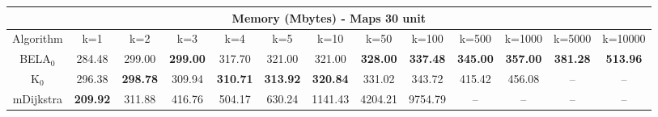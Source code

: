 \begin{tabular}{c|cccccccccccc}\toprule
\multicolumn{13}{c}{Memory (Mbytes) - Maps 30 unit}\\ \midrule
Algorithm & k=1 & k=2 & k=3 & k=4 & k=5 & k=10 & k=50 & k=100 & k=500 & k=1000 & k=5000 & k=10000 \\ \midrule
BELA$_0$ & 284.48 & 299.00 & \textbf{299.00} & 317.70 & 321.00 & 321.00 & \textbf{328.00} & \textbf{337.48} & \textbf{345.00} & \textbf{357.00} & \textbf{381.28} & \textbf{513.96} \\
K$_0$ & 296.38 & \textbf{298.78} & 309.94 & \textbf{310.71} & \textbf{313.92} & \textbf{320.84} & 331.02 & 343.72 & 415.42 & 456.08 & -- & -- \\
mDijkstra & \textbf{209.92} & 311.88 & 416.76 & 504.17 & 630.24 & 1141.43 & 4204.21 & 9754.79 & -- & -- & -- & -- \\ \bottomrule 
\end{tabular}
